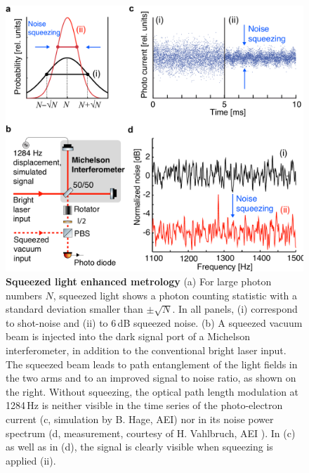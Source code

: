 \begin{figure}[t]
  \centering
  \includegraphics[scale=0.42]{./Sec_Optics/SqzIllustration.pdf}
\caption{{\textbf{Squeezed light enhanced metrology} \; (a) For large photon numbers $N$, squeezed light shows a photon counting statistic with a standard deviation smaller than $\pm \sqrt{N}$. In all panels, (i) correspond to shot-noise and (ii) to 6\,dB squeezed noise. (b) A squeezed vacuum beam is injected into the dark signal port of a Michelson interferometer, in addition to the conventional bright laser input. The squeezed beam leads to path entanglement of the light fields in the two arms and to an improved signal to noise ratio, as shown on the right. Without squeezing, the optical path length modulation at 1284\,Hz is neither visible in the time series of the photo-electron current (c, simulation by B. Hage, AEI) nor in its noise power spectrum (d, measurement, courtesy of H. Vahlbruch, AEI \cite{VahlbruchPhD08}). In (c) as well as in (d), the signal is clearly visible when squeezing is applied (ii).}
}\label{fig:SqzIll}
\end{figure}

